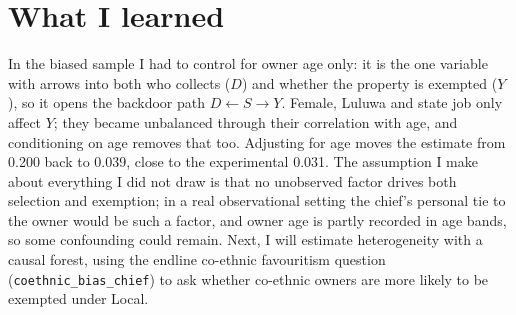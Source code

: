 \documentclass[11pt]{article}
\begin{document}
\section{What I learned}
In the biased sample I had to control for owner age only: it is the one variable with arrows into both who collects ($D$) and whether the property is exempted ($Y$), so it opens the backdoor path $D\leftarrow S\rightarrow Y$. Female, Luluwa and state job only affect $Y$; they became unbalanced through their correlation with age, and conditioning on age removes that too. Adjusting for age moves the estimate from 0.200 back to 0.039, close to the experimental 0.031. The assumption I make about everything I did not draw is that no unobserved factor drives both selection and exemption; in a real observational setting the chief's personal tie to the owner would be such a factor, and owner age is partly recorded in age bands, so some confounding could remain. Next, I will estimate heterogeneity with a causal forest, using the endline co-ethnic favouritism question (\texttt{coethnic\_bias\_chief}) to ask whether co-ethnic owners are more likely to be exempted under Local.
\end{document}
